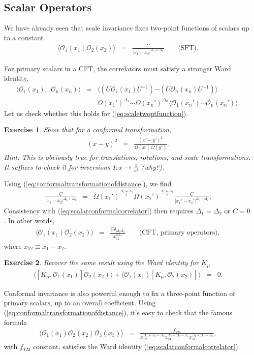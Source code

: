 \documentclass[11pt]{ws-rv9x6}
\newcommand\be{\begin{eqnarray}}
\newcommand\ee{\end{eqnarray}}
\newcommand\cO{\mathcal{O}}
\newcommand\<\langle
\renewcommand\>\rangle
\newcommand\de\delta
\newcommand\nn{\nonumber}
\renewcommand\.{\cdot}
\newcommand\De{\Delta}
\newtheorem{exercise}{Exercise}[section]
\begin{document}
\subsection{Scalar Operators}
\label{sec:conformalcorrelatorsscalars}

We have already seen that scale invariance fixes two-point functions of scalars up to a constant
\be
\label{eq:scaletwoptfunction}
\<\cO_1(x_1)\cO_2(x_2)\> &=& \frac{C}{|x_1-x_2|^{\De_1+\De_2}} \qquad\textrm{(SFT)}.
\ee

For primary scalars in a CFT, the correlators must satisfy a stronger Ward identity,
\be
\label{eq:scalarconformalcorrelator}
\<\cO_1(x_1)\dots\cO_n(x_n)\> &=& \<(U\cO_1(x_1)U^{-1}) \cdots (U\cO_n(x_n)U^{-1})\>\nn\\
 &=& \Omega(x_1')^{\De_1}\cdots\Omega(x_n')^{\De_n}\<\cO_1(x_n')\cdots \cO_n(x_n')\>.
\ee
Let us check whether this holds for (\ref{eq:scaletwoptfunction}).

\begin{exercise}
Show that for a conformal transformation,
\be
\label{eq:conformaltransformationofdistance}
(x-y)^2 &=& \frac{(x'-y')^2}{\Omega(x')\Omega(y')}.
\ee
Hint: This is obviously true for translations, rotations, and scale transformations. It suffices to check it for inversions $I:x\to\frac{x}{x^2}$ (why?).
\end{exercise}
Using (\ref{eq:conformaltransformationofdistance}), we find
\be
\frac{C}{|x_1-x_2|^{\De_1+\De_2}} &=& \Omega(x_1')^{\frac{\De_1+\De_2}{2}}\Omega(x_2')^{\frac{\De_1+\De_2}{2}}\frac{C}{|x_1'-x_2'|^{\De_1+\De_2}}.
\ee
Consistency with (\ref{eq:scalarconformalcorrelator}) then requires $\De_1=\De_2$ or $C=0$.  In other words,
\be
\<\cO_1(x_1)\cO_2(x_2)\> &=& \frac{C\de_{\De_1\De_2}}{x_{12}^{2\De_1}}\qquad\textrm{(CFT, primary operators)},
\ee
where $x_{12}\equiv x_1-x_2$.
\begin{exercise}
Recover the same result using the Ward identity for $K_\mu$
\be
\<[K_\mu,\cO_1(x_1)]\cO_2(x_2)\>+\<\cO_1(x_1)[K_\mu,\cO_2(x_2)]\> &=& 0.
\ee
\end{exercise}

Conformal invariance is also powerful enough to fix a three-point function of primary scalars, up to an overall coefficient.  Using (\ref{eq:conformaltransformationofdistance}), it's easy to check that the famous formula \cite{Polyakov:1970xd}
\be
\label{eq:conformalthreeptfunction}
\<\cO_1(x_1)\cO_2(x_2)\cO_3(x_3)\> &=& \frac{f_{123}}{x_{12}^{\De_1+\De_2-\De_3}x_{23}^{\De_2+\De_3-\De_1}x_{31}^{\De_3+\De_1-\De_2}},
\ee
with $f_{123}$ constant, satisfies the Ward identity (\ref{eq:scalarconformalcorrelator}).
\end{document}
